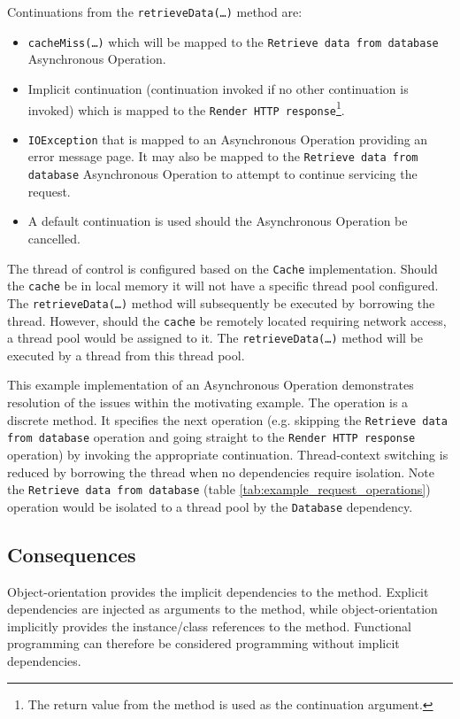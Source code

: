 \documentclass[prodmode]{style/acmlarge}
\begin{document}
Continuations from the \texttt{retrieveData(\ldots)} method are:
\begin{itemize}
  \item \texttt{cacheMiss(\ldots)} which will be mapped to the \texttt{Retrieve data from database} Asynchronous Operation.
  \item Implicit continuation (continuation invoked if no other continuation is invoked) which is mapped to the \texttt{Render HTTP response}\footnote{The return value from the method is used as the continuation argument.}.
  \item \texttt{IOException} that is mapped to an Asynchronous Operation providing an error message page.  It may also be mapped to the \texttt{Retrieve data from database} Asynchronous Operation to attempt to continue servicing the request.
  \item A default continuation is used should the Asynchronous Operation be cancelled.
\end{itemize}

The thread of control is configured based on the \texttt{Cache} implementation.
 Should the \texttt{cache} be in local memory it will not have a specific thread
pool configured.  The \texttt{retrieveData(\ldots)} method will subsequently be
executed by borrowing the thread.  However, should the \texttt{cache} be
remotely located requiring network access, a thread pool would be assigned to
it.  The \texttt{retrieveData(\ldots)} method will be executed by a thread from
this thread pool.

This example implementation of an Asynchronous Operation demonstrates resolution
of the issues within the motivating example.  The operation is a discrete
method.  It specifies the next operation (e.g. skipping the \texttt{Retrieve
data from database} operation and going straight to the \texttt{Render HTTP
response} operation) by invoking the appropriate continuation.  Thread-context
switching is reduced by borrowing the thread when no dependencies require
isolation.  Note the \texttt{Retrieve data from database} (table
\ref{tab:example_request_operations}) operation would be isolated to a thread
pool by the \texttt{Database} dependency.


\subsection{Consequences}

Object-orientation provides the implicit dependencies to the method.  Explicit
dependencies are injected as arguments to the method, while object-orientation
implicitly provides the instance/class references to the method.  Functional
programming can therefore be considered programming without implicit
dependencies.
\end{document}
